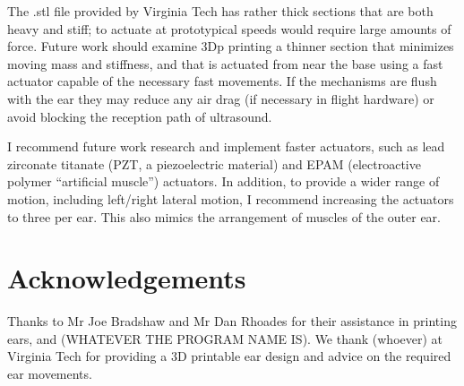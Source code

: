 \documentclass{article}
\begin{document}
The .stl file provided by Virginia Tech has rather thick sections that are both heavy and stiff; to actuate at prototypical speeds would require large amounts of force.  Future work should examine 3Dp printing a thinner section that minimizes moving mass and stiffness, and that is actuated from near the base using a fast actuator capable of the necessary fast movements. If the mechanisms are flush with the ear they may reduce any air drag (if necessary in flight hardware) or avoid blocking the reception path of ultrasound. 

I recommend future work research and implement faster actuators, such as lead zirconate titanate (PZT, a piezoelectric material) and EPAM (electroactive polymer ``artificial muscle'') actuators. In addition, to provide a wider range of motion, including left/right lateral motion, I recommend increasing the actuators to three per ear. This also mimics the arrangement of muscles of the outer ear. 

\section*{Acknowledgements}
Thanks to Mr Joe Bradshaw and Mr Dan Rhoades for their assistance in printing ears, and (WHATEVER THE PROGRAM NAME IS). We thank (whoever) at Virginia Tech for providing a 3D printable ear design and advice on the required ear movements. 


\end{document}
